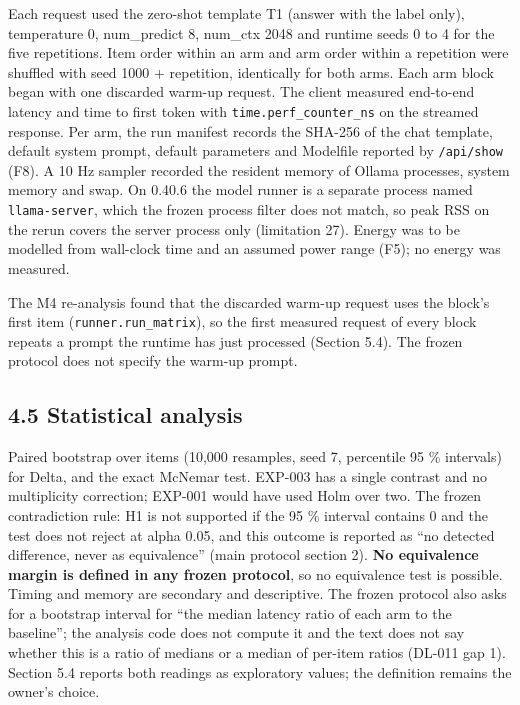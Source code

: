 \documentclass[
]{article}
\begin{document}
Each request used the zero-shot template T1 (answer with the label
only), temperature 0, num\_predict 8, num\_ctx 2048 and runtime seeds 0
to 4 for the five repetitions. Item order within an arm and arm order
within a repetition were shuffled with seed 1000 + repetition,
identically for both arms. Each arm block began with one discarded
warm-up request. The client measured end-to-end latency and time to
first token with \texttt{time.perf\_counter\_ns} on the streamed
response. Per arm, the run manifest records the SHA-256 of the chat
template, default system prompt, default parameters and Modelfile
reported by \texttt{/api/show} (F8). A 10 Hz sampler recorded the
resident memory of Ollama processes, system memory and swap. On 0.40.6
the model runner is a separate process named \texttt{llama-server},
which the frozen process filter does not match, so peak RSS on the rerun
covers the server process only (limitation 27). Energy was to be
modelled from wall-clock time and an assumed power range (F5); no energy
was measured.

The M4 re-analysis found that the discarded warm-up request uses the
block's first item (\texttt{runner.run\_matrix}), so the first measured
request of every block repeats a prompt the runtime has just processed
(Section 5.4). The frozen protocol does not specify the warm-up prompt.

\subsection{4.5 Statistical analysis}\label{statistical-analysis}

Paired bootstrap over items (10,000 resamples, seed 7, percentile 95 \%
intervals) for Delta, and the exact McNemar test. EXP-003 has a single
contrast and no multiplicity correction; EXP-001 would have used Holm
over two. The frozen contradiction rule: H1 is not supported if the 95
\% interval contains 0 and the test does not reject at alpha 0.05, and
this outcome is reported as ``no detected difference, never as
equivalence'' (main protocol section 2). \textbf{No equivalence margin
is defined in any frozen protocol}, so no equivalence test is possible.
Timing and memory are secondary and descriptive. The frozen protocol
also asks for a bootstrap interval for ``the median latency ratio of
each arm to the baseline''; the analysis code does not compute it and
the text does not say whether this is a ratio of medians or a median of
per-item ratios (DL-011 gap 1). Section 5.4 reports both readings as
exploratory values; the definition remains the owner's choice.
\end{document}
